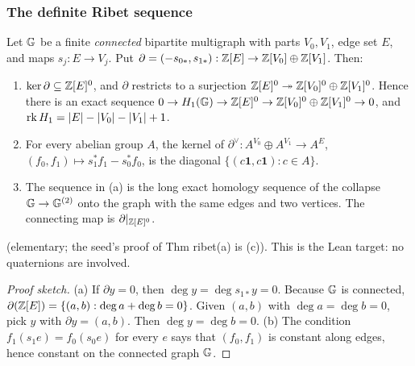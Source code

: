 \subsubsection{The definite Ribet sequence}
\begin{lemma}\label{lem:s03-bip}
Let $\mathbb{G}$ be a finite \emph{connected} bipartite multigraph with parts $V_0,V_1$, edge set $E$, and maps $s_j:E\to V_j$. Put
$\partial=(-s_{0*},s_{1*}):\mathbb{Z}[E]\to\mathbb{Z}[V_0]\oplus\mathbb{Z}[V_1]$. Then:
\begin{enumerate}[label=(\alph*)]
\item $\ker\partial\subseteq\mathbb{Z}[E]^0$, and $\partial$ restricts to a surjection $\mathbb{Z}[E]^0\twoheadrightarrow\mathbb{Z}[V_0]^0\oplus\mathbb{Z}[V_1]^0$.
  Hence there is an exact sequence $0\to H_1(\mathbb{G})\to\mathbb{Z}[E]^0\to\mathbb{Z}[V_0]^0\oplus\mathbb{Z}[V_1]^0\to0$, and $\operatorname{rk} H_1=|E|-|V_0|-|V_1|+1$.
\item For every abelian group $A$, the kernel of $\partial^\vee:A^{V_0}\oplus A^{V_1}\to A^E$, $(f_0,f_1)\mapsto s_1^*f_1-s_0^*f_0$, is
  the diagonal $\{(c\mathbf1,c\mathbf1):c\in A\}$.
\item The sequence in (a) is the long exact homology sequence of the collapse $\mathbb{G}\to\mathbb{G}^{(2)}$ onto the graph with the same edges and two
  vertices. The connecting map is $\partial|_{\mathbb{Z}[E]^0}$.
\end{enumerate}
\sttoprove{} (elementary; the seed's proof of Thm ribet(a) is (c)). This is the Lean target: no quaternions are involved.
\end{lemma}
\begin{proof}[Proof sketch]
(a) If $\partial y=0$, then $\deg y=\deg s_{1*}y=0$. Because $\mathbb{G}$ is connected, $\partial(\mathbb{Z}[E])=\{(a,b):\deg a+\deg b=0\}$. Given
$(a,b)$ with $\deg a=\deg b=0$, pick $y$ with $\partial y=(a,b)$. Then $\deg y=\deg b=0$. (b) The condition $f_1(s_1e)=f_0(s_0e)$ for
every $e$ says that $(f_0,f_1)$ is constant along edges, hence constant on the connected graph $\mathbb{G}$.
\end{proof}

